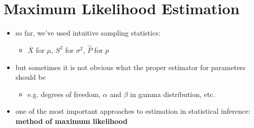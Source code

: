 \documentclass[10pt]{article}
\begin{document}
\section{Maximum Likelihood Estimation}
\begin{itemize}
    \item so far, we've used intuitive sampling statistics:
        \begin{itemize}
            \item $\overline{X}$ for $\mu$, $S^2$ for $\sigma^2$, $\hat{P}$ for $p$
        \end{itemize}
    \item but sometimes it is not obvious what the proper estimator for parameters should be 
        \begin{itemize}
            \item e.g. degrees of freedom, $\alpha$ and $\beta$ in gamma distribution, etc.
        \end{itemize}
    \item one of the most important approaches to estimation in statistical inference: \textbf{method of maximum likelihood} 
\end{itemize}
\end{document}
